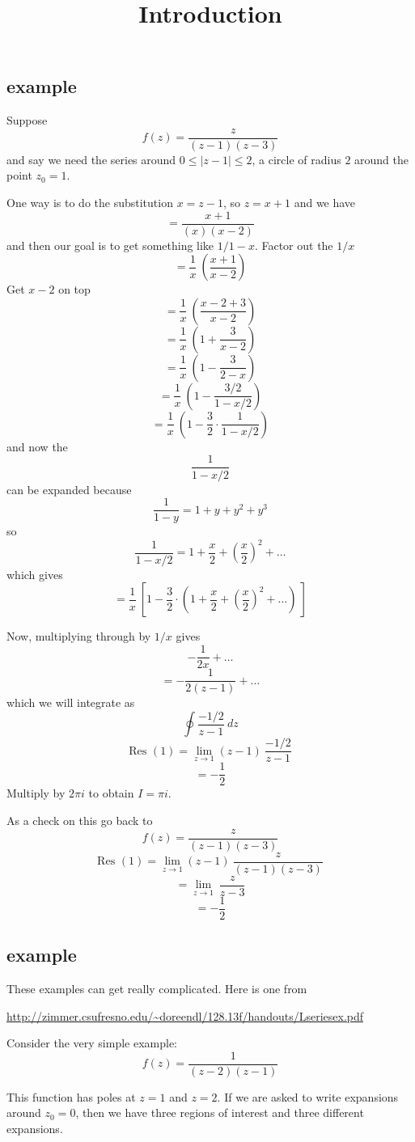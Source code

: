 \documentclass[11pt, oneside]{article}
\title{Introduction}
\date{}
\begin{document}
\maketitle
\Large

\subsection*{example}
Suppose
\[ f(z) = \frac{z}{(z-1)(z-3)} \]
and say we need the series around $0 \le | z - 1 | \le 2$, a circle of radius $2$ around the point $z_0 = 1$.

One way is to do the substitution $x = z - 1$, so $z = x + 1$ and we have
\[  = \frac{x+1}{(x)(x-2)} \]
and then our goal is to get something like $1/1-x$.  Factor out the $1/x$
\[ = \frac{1}{x} \ ( \frac{x+1}{x-2} ) \]
Get $x - 2$ on top
\[ = \frac{1}{x} \ ( \frac{x - 2 +  3}{x - 2} ) \]
\[ = \frac{1}{x} \ ( 1 + \frac{ 3}{x-2} ) \]
\[ = \frac{1}{x} \ ( 1 - \frac{ 3}{2-x} ) \]
\[ = \frac{1}{x} \ ( 1 - \frac{ 3/2}{1 - x/2} ) \]
\[ = \frac{1}{x} \ ( 1 - \frac{3}{2} \cdot \frac{1}{1 - x/2} ) \]
and now the 
\[ \frac{1}{1 - x/2} \]
can be expanded because
\[ \frac{1}{1 - y} = 1 + y + y^2 + y^3 \]
so 
\[ \frac{1}{1 - x/2} = 1 + \frac{x}{2} + (\frac{x}{2} )^2 + \dots \]
which gives
\[ = \frac{1}{x} \ [ 1 - \frac{3}{2} \cdot (1 + \frac{x}{2} + (\frac{x}{2} )^2 + \dots) \ ] \]

Now, multiplying through by $1/x$ gives
\[ -\frac{1}{2x} + \dots \]
\[ = -\frac{1}{2(z-1)} + \dots \]
which we will integrate as
\[ \oint \frac{-1/2}{z-1} \ dz \]
\[ \text{Res }(1) = \lim_{z \rightarrow 1} (z-1) \ \frac{-1/2}{z-1} \]
\[ = -\frac{1}{2} \]
Multiply by $2 \pi i$ to obtain $I = \pi i$.

As a check on this go back to 
\[ f(z) = \frac{z}{(z-1)(z-3)} \]
\[ \text{Res }(1) = \lim_{z \rightarrow 1} (z-1) \ \frac{z}{(z-1)(z-3)} \]
\[ =  \lim_{z \rightarrow 1} \ \frac{z}{z-3} \]
\[ = -\frac{1}{2} \]

\subsection*{example}
These examples can get really complicated.  Here is one from

\url{http://zimmer.csufresno.edu/~doreendl/128.13f/handouts/Lseriesex.pdf}

Consider the very simple example:
\[ f(z) = \frac{1}{(z-2)(z-1)} \]

This function has poles at $z = 1$ and $z = 2$.  If we are asked to write expansions around $z_0 = 0$, then we have three regions of interest and three different expansions.
\end{document}
